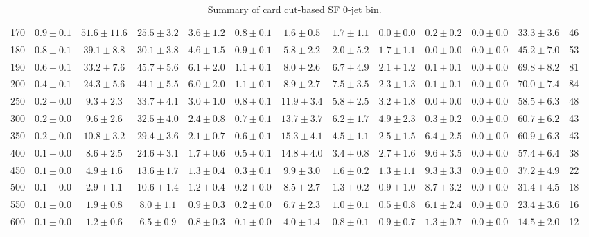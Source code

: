 \begin{table}
{\begin{center}
\begin{tabular}{l | c c | c c c c c c c c  | c c}
170 & $0.9\pm0.1$ & $51.6\pm11.6$ & $25.5\pm3.2$ & $3.6\pm1.2$ & $0.8\pm0.1$ & $1.6\pm0.5$ & $1.7\pm1.1$ & $0.0\pm0.0$ & $0.2\pm0.2$ & $0.0\pm0.0$ & $33.3\pm3.6$ & 46 \\
180 & $0.8\pm0.1$ & $39.1\pm8.8$ & $30.1\pm3.8$ & $4.6\pm1.5$ & $0.9\pm0.1$ & $5.8\pm2.2$ & $2.0\pm5.2$ & $1.7\pm1.1$ & $0.0\pm0.0$ & $0.0\pm0.0$ & $45.2\pm7.0$ & 53 \\
190 & $0.6\pm0.1$ & $33.2\pm7.6$ & $45.7\pm5.6$ & $6.1\pm2.0$ & $1.1\pm0.1$ & $8.0\pm2.6$ & $6.7\pm4.9$ & $2.1\pm1.2$ & $0.1\pm0.1$ & $0.0\pm0.0$ & $69.8\pm8.2$ & 81 \\
200 & $0.4\pm0.1$ & $24.3\pm5.6$ & $44.1\pm5.5$ & $6.0\pm2.0$ & $1.1\pm0.1$ & $8.9\pm2.7$ & $7.5\pm3.5$ & $2.3\pm1.3$ & $0.1\pm0.1$ & $0.0\pm0.0$ & $70.0\pm7.4$ & 84 \\
250 & $0.2\pm0.0$ & $9.3\pm2.3$ & $33.7\pm4.1$ & $3.0\pm1.0$ & $0.8\pm0.1$ & $11.9\pm3.4$ & $5.8\pm2.5$ & $3.2\pm1.8$ & $0.0\pm0.0$ & $0.0\pm0.0$ & $58.5\pm6.3$ & 48 \\
300 & $0.2\pm0.0$ & $9.6\pm2.6$ & $32.5\pm4.0$ & $2.4\pm0.8$ & $0.7\pm0.1$ & $13.7\pm3.7$ & $6.2\pm1.7$ & $4.9\pm2.3$ & $0.3\pm0.2$ & $0.0\pm0.0$ & $60.7\pm6.2$ & 43 \\
350 & $0.2\pm0.0$ & $10.8\pm3.2$ & $29.4\pm3.6$ & $2.1\pm0.7$ & $0.6\pm0.1$ & $15.3\pm4.1$ & $4.5\pm1.1$ & $2.5\pm1.5$ & $6.4\pm2.5$ & $0.0\pm0.0$ & $60.9\pm6.3$ & 43 \\
400 & $0.1\pm0.0$ & $8.6\pm2.5$ & $24.6\pm3.1$ & $1.7\pm0.6$ & $0.5\pm0.1$ & $14.8\pm4.0$ & $3.4\pm0.8$ & $2.7\pm1.6$ & $9.6\pm3.5$ & $0.0\pm0.0$ & $57.4\pm6.4$ & 38 \\
450 & $0.1\pm0.0$ & $4.9\pm1.6$ & $13.6\pm1.7$ & $1.3\pm0.4$ & $0.3\pm0.1$ & $9.9\pm3.0$ & $1.6\pm0.2$ & $1.3\pm1.1$ & $9.3\pm3.3$ & $0.0\pm0.0$ & $37.2\pm4.9$ & 22 \\
500 & $0.1\pm0.0$ & $2.9\pm1.1$ & $10.6\pm1.4$ & $1.2\pm0.4$ & $0.2\pm0.0$ & $8.5\pm2.7$ & $1.3\pm0.2$ & $0.9\pm1.0$ & $8.7\pm3.2$ & $0.0\pm0.0$ & $31.4\pm4.5$ & 18 \\
550 & $0.1\pm0.0$ & $1.9\pm0.8$ & $8.0\pm1.1$ & $0.9\pm0.3$ & $0.2\pm0.0$ & $6.7\pm2.3$ & $1.0\pm0.1$ & $0.5\pm0.8$ & $6.1\pm2.4$ & $0.0\pm0.0$ & $23.4\pm3.6$ & 16 \\
600 & $0.1\pm0.0$ & $1.2\pm0.6$ & $6.5\pm0.9$ & $0.8\pm0.3$ & $0.1\pm0.0$ & $4.0\pm1.4$ & $0.8\pm0.1$ & $0.9\pm0.7$ & $1.3\pm0.7$ & $0.0\pm0.0$ & $14.5\pm2.0$ & 12 \\
\hline
\end{tabular}
\end{center}
}
\caption{Summary of card cut-based SF 0-jet bin.}
\end{table}
